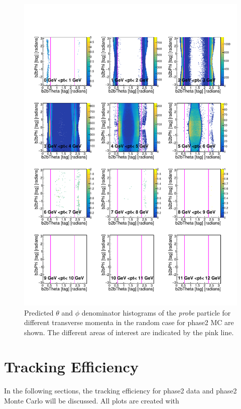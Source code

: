 \documentclass[a4paper,11pt,twosided,final,german,openbib,pdftex,listof=totoc,bibliography=totoc]{scrbook}
\begin{document}
\begin{figure}[h!]
	\includegraphics[width=\textwidth]{Plots/RTPtMRandomD_MC.pdf}
	\caption{Predicted $\theta$ and $\phi$ denominator histograms of the \textit{probe} particle for different transverse momenta in the random case for phase2 MC are shown. The different areas of interest are indicated by the pink line.}
	\label{plt:RTPtMRandomD_MC}
\end{figure}





\section{Tracking Efficiency}
\label{sec:TrackingEfficiency}

In the following sections, the tracking efficiency for phase2 data and phase2 Monte Carlo will be discussed. All plots are created with 
\end{document}
